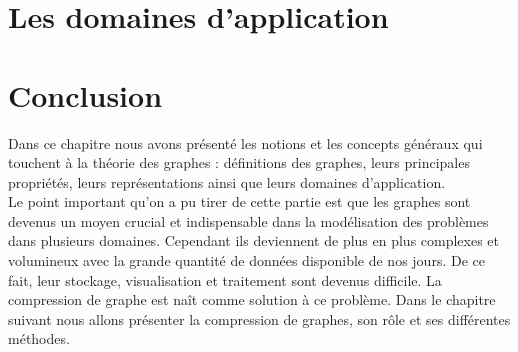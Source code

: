 	\section{Les domaines d'application}
			
		
	
	
			
	\section{Conclusion}
Dans ce chapitre nous avons présenté les notions et les concepts généraux qui touchent à la théorie des graphes : définitions des graphes, leurs principales propriétés, leurs représentations ainsi que leurs domaines d'application.\\
Le point important qu'on a pu tirer de cette partie est que les graphes sont devenus un moyen crucial et indispensable dans la modélisation des problèmes dans plusieurs domaines. Cependant ils deviennent de plus en plus complexes et volumineux avec la grande quantité de données disponible de nos jours. De ce fait, leur stockage, visualisation et traitement sont devenus difficile. La compression de graphe est naît comme solution à ce problème. Dans le chapitre suivant nous allons présenter la compression de graphes, son rôle et ses différentes méthodes.  
	
	